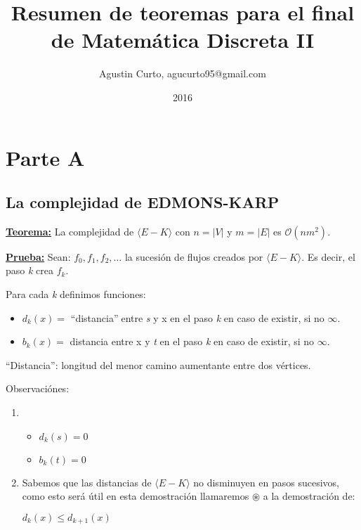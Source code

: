 \documentclass[12pt,a4paper]{report}
\author{Agustin Curto, agucurto95@gmail.com}
\title{Resumen de teoremas para el final \\ de Matemática Discreta  II}
\date{2016}
\providecommand{\abs}[1]{\lvert#1\rvert}
\begin{document}
\maketitle
\tableofcontents


\chapter{Parte A}

	\section{La complejidad de EDMONS-KARP}
	
		\textbf{\underline{Teorema:}} La complejidad de $\langle E-K \rangle$ con $n = \abs{V}$ y $m = \abs{E}$ es $\mathcal{O}(nm^{2})$.
	
		\textbf{\underline{Prueba:}} Sean: $f_{0}, f_{1}, f_{2}, \dotsc$ \;  la sucesión de flujos creados por $\langle E-K \rangle$. Es decir, el paso \textit{k} crea $f_{k}$.
		
		\vspace{5mm}
		Para cada \textit{k} definimos funciones:
		
		\begin{itemize}
			\item $d_{k}(x) =$ \textquotedblleft distancia\textquotedblright$\;$entre \textit{s} y x en el paso \textit{k} en caso de existir, si no $\infty$.
			\item $b_{k}(x) =$ distancia entre x y \textit{t} en el paso \textit{k} en caso de existir, si no $\infty$.
		\end{itemize}
	
		\textquotedblleft Distancia\textquotedblright: longitud del menor camino aumentante entre dos vértices.
		
		\vspace{5mm}
		Observaciónes:
			\begin{enumerate}
				\item
					\begin{itemize}
						\item $d_{k}(s) = 0$
						\item $b_{k}(t) = 0$
					\end{itemize}
				\item Sabemos que las distancias de $\langle E-K \rangle$ no disminuyen en pasos sucesivos, como esto será útil en esta demostración llamaremos $\circledast$ a la demostración de:
			\begin{center}
				$d_{k}(x) \leq d_{k+1}(x)$
			\end{center}
			\end{enumerate}
\end{document}
